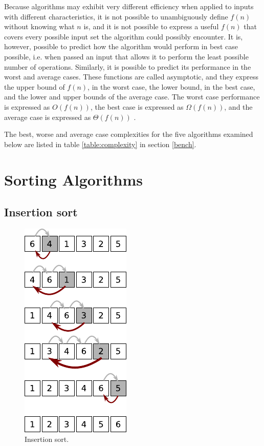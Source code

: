 \documentclass[12pt, a4paper]{article}
\begin{document}
Because algorithms may exhibit very different efficiency when applied to inputs with different characteristics, it is not possible to unambiguously define $f(n)$ without knowing what $n$ is, and it is not possible to express a useful $f(n)$ that covers every possible input set the algorithm could possibly encounter. It is, however, possible to predict how the algorithm would perform in best case possible, i.e. when passed an input that allows it to perform the least possible number of operations. Similarly, it is possible to predict its performance in the worst and average cases. These functions are called asymptotic, and they express the upper bound of $f(n)$, in the worst case, the lower bound, in the best case, and the lower and upper bounds of the average case. The worst case performance is expressed as $O(f(n))$, the best case is expressed as $\Omega(f(n))$, and the average case is expressed as $\Theta(f(n))$ \autocite[18]{heineman2016algorithms}.

The best, worse and average case complexities for the five algorithms examined below are listed in table \ref{table:complexity} in section \ref{bench}.

\section{Sorting Algorithms}

\subsection{Insertion sort}\label{sec:insertion}


\begin{figure}
    \centering
    \includegraphics{figures/insertion_sort.pdf}
    \caption{\label{fig:insertion_sort}Insertion sort.}
\end{figure}
\end{document}
